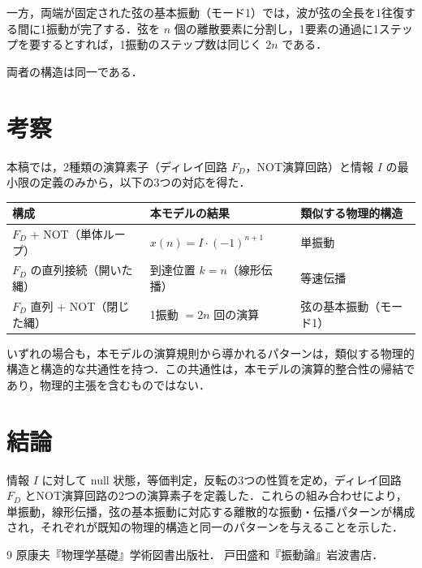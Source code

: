 \documentclass[12pt,a4paper]{ltjsarticle}
\begin{document}
一方，両端が固定された弦の基本振動（モード1）では，波が弦の全長を1往復する間に1振動が完了する．弦を $n$ 個の離散要素に分割し，1要素の通過に1ステップを要するとすれば，1振動のステップ数は同じく $2n$ である．

両者の構造は同一である．

\section{考察}

本稿では，2種類の演算素子（ディレイ回路 $F_D$，NOT演算回路）と情報 $I$ の最小限の定義のみから，以下の3つの対応を得た．

\begin{table}[htbp]
  \centering
  \begin{tabular}{lll}
    \toprule
    構成 & 本モデルの結果 & 類似する物理的構造 \\
    \midrule
    $F_D$ + NOT（単体ループ） & $x(n) = I \cdot (-1)^{n+1}$ & 単振動 \\
    $F_D$ の直列接続（開いた縄） & 到達位置 $k = n$（線形伝播） & 等速伝播 \\
    $F_D$ 直列 + NOT（閉じた縄） & 1振動 $= 2n$ 回の演算 & 弦の基本振動（モード1） \\
    \bottomrule
  \end{tabular}
\end{table}

いずれの場合も，本モデルの演算規則から導かれるパターンは，類似する物理的構造と構造的な共通性を持つ．この共通性は，本モデルの演算的整合性の帰結であり，物理的主張を含むものではない．

\section{結論}

情報 $I$ に対して null 状態，等価判定，反転の3つの性質を定め，ディレイ回路 $F_D$ とNOT演算回路の2つの演算素子を定義した．これらの組み合わせにより，単振動，線形伝播，弦の基本振動に対応する離散的な振動・伝播パターンが構成され，それぞれが既知の物理的構造と同一のパターンを与えることを示した．

\begin{thebibliography}{9}
 原康夫『物理学基礎』学術図書出版社．
 戸田盛和『振動論』岩波書店．
\end{thebibliography}
\end{document}
